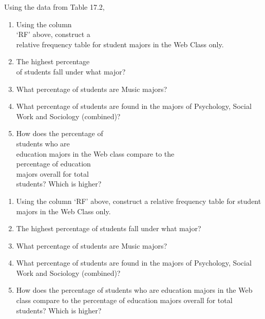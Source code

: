 \documentclass[11pt]{book}\usepackage[]{graphicx}\usepackage[]{color}
\begin{document}
\begin{exercises}
\begin{exercise}
\begin{minipage}[ht]{5.8cm}
    Using the data from Table 17.2,

\begin{enumerate}
  \item	Using the column \\ `RF' above, construct a \\ relative frequency table for student majors in the Web Class only.
  \item	The highest percentage \\ of students fall under what major?
  \item	What percentage of students are Music majors?
  \item	What percentage of students are found in the majors of Psychology, Social Work and Sociology (combined)?
  \item	How does the percentage of \\ students who are \\ education  majors in the Web class compare to  the \\ percentage of  education \\ majors overall for total \\ students?  Which is higher?
\end{enumerate}

\end{minipage}
    \end{exercise}
    \begin{solution} %

  \begin{enumerate}
  \item	Using the column `RF' above, construct a relative frequency table for student majors in the Web Class only.
  \item	The highest percentage of students fall under what major?
  \item	What percentage of students are Music majors?
  \item	What percentage of students are found in the majors of Psychology, Social Work and Sociology (combined)?
  \item	How does the percentage of students who are education majors in the Web class compare to the percentage of education majors overall for total students?  Which is higher?
\end{enumerate}
    \end{solution}

\clearpage

    \begin{exercise}  %


\end{exercise}
\end{exercises}
\end{document}
